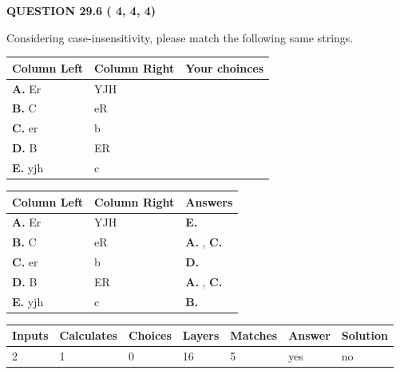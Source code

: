 \documentclass[12pt]{article}
\begin{document}
   
  
\vspace{0.2in}
  
{\textbf{\Large{QUESTION
29.6 
 (          4,          4,          4)
}}}
  
  
Considering case-insensitivity, please match the following same strings.
  
  
\begin{tabular}{|l|l|l|}
 \hline
 Column Left & Column Right  & Your choinces \\ 
 \hline
{\textbf{\large{
A.}}}
Er
  & 
YJH
 & 
 \\ 
 \hline
{\textbf{\large{
B.}}}
C
  & 
eR
 & 
 \\ 
 \hline
{\textbf{\large{
C.}}}
er
  & 
b
 & 
 \\ 
 \hline
{\textbf{\large{
D.}}}
B
  & 
ER
 & 
 \\ 
 \hline
{\textbf{\large{
E.}}}
yjh
  & 
c
 & 
 \\ 
 \hline
 \end{tabular}
  
  
 
 
\noindent{}
  
  
\begin{tabular}{|l|l|l|}
 \hline
 Column Left & Column Right  & Answers       \\ 
 \hline
{\textbf{\large{
A.}}}
Er
  & 
YJH
 & 
{\textbf{\large{
E.}}}
 \\ 
 \hline
{\textbf{\large{
B.}}}
C
  & 
eR
 & 
{\textbf{\large{
A.}}}
, 
{\textbf{\large{
C.}}}
 \\ 
 \hline
{\textbf{\large{
C.}}}
er
  & 
b
 & 
{\textbf{\large{
D.}}}
 \\ 
 \hline
{\textbf{\large{
D.}}}
B
  & 
ER
 & 
{\textbf{\large{
A.}}}
, 
{\textbf{\large{
C.}}}
 \\ 
 \hline
{\textbf{\large{
E.}}}
yjh
  & 
c
 & 
{\textbf{\large{
B.}}}
 \\ 
 \hline
 \end{tabular}
  
  
 
 
\noindent{}
 
 
 
   
   
   
   
\noindent\begin{tabular}{|l|l|l|l|l|l|l|}
 \hline
Inputs & Calculates & Choices & Layers & Matches & Answer & Solution \\ \hline
           2 & 
           1 & 
           0
  & 
          16 & 
           5 & 
  yes & 
  no 
  \\ \hline
 \end{tabular}
   
\end{document}
